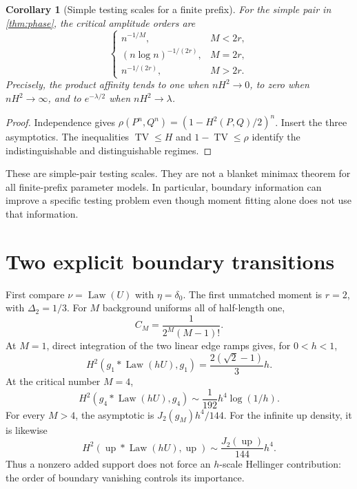 \documentclass[11pt,a4paper]{article}
\numberwithin{equation}{section}
\newtheorem{corollary}[theorem]{Corollary}
\theoremstyle{definition}
\theoremstyle{remark}
\DeclareMathOperator{\Law}{Law}
\DeclareMathOperator{\TV}{TV}
\newcommand{\up}{\operatorname{up}}
\begin{document}
\begin{corollary}[Simple testing scales for a finite prefix]
\label{cor:finite-testing}
For the simple pair in \cref{thm:phase}, the critical amplitude orders are
\begin{equation}
 \begin{cases}
 n^{-1/M},&M<2r,\\
 (n\log n)^{-1/(2r)},&M=2r,\\
 n^{-1/(2r)},&M>2r.
 \end{cases}
 \label{eq:finite-testing}
\end{equation}
Precisely, the product affinity tends to one when $nH^2\to0$, to zero
when $nH^2\to\infty$, and to $e^{-\lambda/2}$ when $nH^2\to\lambda$.
\end{corollary}
\begin{proof}
Independence gives
$\rho(P^n,Q^n)=(1-H^2(P,Q)/2)^n$. Insert the three asymptotics.
The inequalities $\TV\le H$ and $1-\TV\le\rho$ identify the
indistinguishable and distinguishable regimes.
\end{proof}
These are simple-pair testing scales. They are not a blanket minimax theorem
for all finite-prefix parameter models. In particular, boundary information
can improve a specific testing problem even though moment fitting alone
does not use that information.

\section{Two explicit boundary transitions}
\label{sec:transitions}

First compare $\nu=\Law(U)$ with $\eta=\delta_0$. The first unmatched
moment is $r=2$, with $\Delta_2=1/3$. For $M$ background uniforms all of
half-length one,
\begin{equation}
 C_M=\frac1{2^M(M-1)!}.
 \label{eq:equal-C}
\end{equation}
At $M=1$, direct integration of the two linear edge ramps gives, for
$0<h<1$,
\begin{equation}
 H^2(g_1*\Law(hU),g_1)
 =\frac{2(\sqrt2-1)}3h.
 \label{eq:M1}
\end{equation}
At the critical number $M=4$,
\begin{equation}
 H^2(g_4*\Law(hU),g_4)
 \sim\frac1{192}h^4\log(1/h).
 \label{eq:M4}
\end{equation}
For every $M>4$, the asymptotic is $J_2(g_M)h^4/144$.
For the infinite up density, it is likewise
\begin{equation}
 H^2(\up*\Law(hU),\up)\sim\frac{J_2(\up)}{144}h^4.
 \label{eq:up-single}
\end{equation}
Thus a nonzero added support does not force an $h$-scale Hellinger
contribution: the order of boundary vanishing controls its importance.
\end{document}
